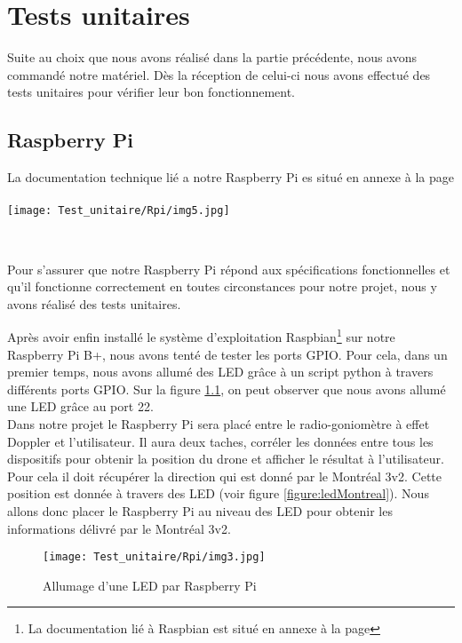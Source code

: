 \chapter{Tests unitaires}

Suite au choix que nous avons réalisé dans la partie précédente, nous avons commandé notre matériel. Dès la réception de celui-ci nous avons effectué des tests unitaires pour vérifier leur bon fonctionnement.

\section{Raspberry Pi}
La documentation technique lié a notre Raspberry Pi es situé en annexe à la page \pageref{annexe:rpi}
~\\

\texttt{[image: Test\_unitaire/Rpi/img5.jpg]}

~\\
\parindent=15pt

Pour s'assurer que notre Raspberry Pi répond aux spécifications fonctionnelles et qu'il fonctionne correctement en toutes circonstances pour notre projet, nous y avons réalisé des tests unitaires.

Après avoir enfin installé le système d'exploitation Raspbian\footnote{La documentation lié à Raspbian est situé en annexe à la page \pageref{annexe:raspbian}} sur notre Raspberry Pi B+, nous avons tenté de tester les ports GPIO. Pour cela, dans un premier temps, nous avons allumé des LED grâce à un script python à travers différents ports GPIO. Sur la figure \ref{figure:led}, on peut observer que nous avons allumé une LED grâce au port 22.
~\\

Dans notre projet le Raspberry Pi sera placé entre le radio-goniomètre à effet Doppler et l'utilisateur. Il aura deux taches, corréler les données entre tous les dispositifs pour obtenir la position du drone et afficher le résultat à l'utilisateur. Pour cela il doit récupérer la direction qui est donné par le Montréal 3v2. Cette position est donnée à travers des LED (voir figure \ref{figure:ledMontreal}). Nous allons donc placer le Raspberry Pi au niveau des LED pour obtenir les informations délivré par le Montréal 3v2. %

\begin{figure}[!h]
  \texttt{[image: Test\_unitaire/Rpi/img3.jpg]}
  \caption{Allumage d'une LED par Raspberry Pi}
  \label{figure:led}
\end{figure}

